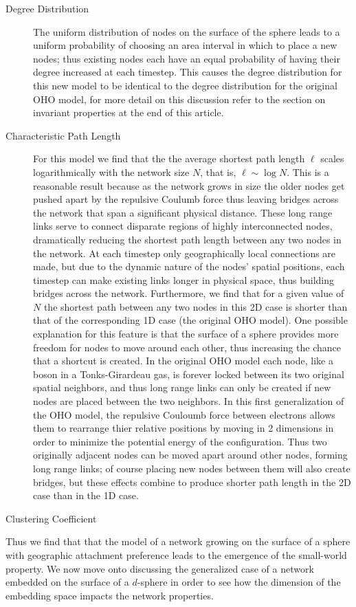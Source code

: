 \documentclass[aps,pre,reprint,superscriptaddress,amsmath,amssymb]{revtex4-1}
\begin{document}
\begin{description}
  \item[Degree Distribution] The uniform distribution of nodes on the surface of the sphere leads to a uniform probability of choosing an area interval in which to place a new nodes; thus existing nodes each have an equal probability of having their degree increased at each timestep.
This causes the degree distribution for this new model to be identical to the degree distribution for the original OHO model, for more detail on this discussion refer to the section on invariant properties at the end of this article.
  \item[Characteristic Path Length] For this model we find that the the average shortest path length $\ell$ scales logarithmically with the network size $N$, that is, $\ell \sim \log N$. 
This is a reasonable result because as the network grows in size the older nodes get pushed apart by the repulsive Coulumb force thus leaving bridges across the network that span a significant physical distance.
These long range links serve to connect disparate regions of highly interconnected nodes, dramatically reducing the shortest path length between any two nodes in the network.
At each timestep only geographically local connections are made, but due to the dynamic nature of the nodes' spatial positions, each timestep can make existing links longer in physical space, thus building bridges across the network.
Furthermore, we find that for a given value of $N$ the shortest path between any two nodes in this 2D case is shorter than that of the corresponding 1D case (the original OHO model).
One possible explanation for this feature is that the surface of a sphere provides more freedom for nodes to move around each other, thus increasing the chance that a shortcut is created.
In the original OHO model each node, like a boson in a Tonks-Girardeau gas, is forever locked between its two original spatial neighbors, and thus long range links can only be created if new nodes are placed between the two neighbors.
In this first generalization of the OHO model, the repulsive Couloumb force between electrons allows them to rearrange thier relative positions by moving in 2 dimensions in order to minimize the potential energy of the configuration.
Thus two originally adjacent nodes can be moved apart around other nodes, forming long range links; of course placing new nodes between them will also create bridges, but these effects combine to produce shorter path length in the 2D case than in the 1D case.
  \item[Clustering Coefficient] 
\end{description}
Thus we find that that the model of a network growing on the surface of a sphere with geographic attachment preference leads to the emergence of the small-world property.
We now move onto discussing the generalized case of a network embedded on the surface of a $d$-sphere in order to see how the dimension of the embedding space impacts the network properties.
\end{document}
